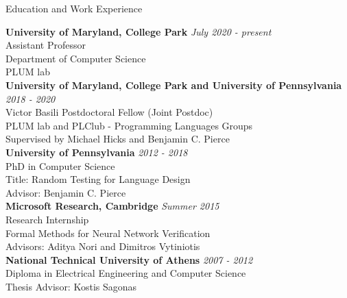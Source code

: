 \documentclass{resume} %
\begin{document}

\newcommand{\edu}[4]{
  {\bf #3} \hfill {\em #2}\\
  {#1}\\
  #4\\
}

\begin{rSection}{Education and Work Experience}

\edu{Assistant Professor}{July 2020 - present}
    {University of Maryland, College Park}
    {Department of Computer Science\\
     PLUM lab}
  
\edu{Victor Basili Postdoctoral Fellow (Joint Postdoc)}{2018 - 2020}
    {University of Maryland, College Park and University of Pennsylvania}{
      PLUM lab and PLClub - Programming Languages Groups\\
      Supervised by Michael Hicks and Benjamin C. Pierce
    }
% 

\edu{PhD in Computer Science}{2012 - 2018}
    {University of Pennsylvania}{
      Title: Random Testing for Language Design\\
      Advisor: Benjamin C. Pierce
    }
    
\edu{Research Internship}{Summer 2015}
    {Microsoft Research, Cambridge}{
      Formal Methods for Neural Network Verification\\
      Advisors: Aditya Nori and Dimitros Vytiniotis
    }

\edu{Diploma in Electrical Engineering and Computer Science}{2007 - 2012}
    {National Technical University of Athens}
    {
      Thesis Advisor: Kostis Sagonas
     }

%    
\end{rSection}

\end{document}
